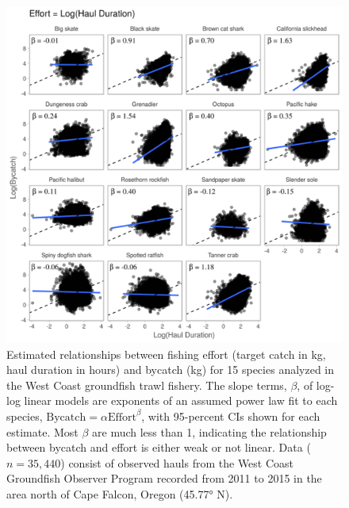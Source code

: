 \documentclass[]{article}
\begin{document}
\begin{figure}

{\centering \includegraphics[width=6in]{../figures/fig2_effort_bycatch/fig2_effort_bycatch_hauldur} 

}

\caption{Estimated relationships between fishing effort (target catch in kg, haul duration in hours) and bycatch (kg) for 15 species analyzed in the West Coast groundfish trawl fishery. The slope terms, $\beta$, of log-log linear models are exponents of an assumed power law fit to each species, $\text{Bycatch} = \alpha \text{Effort}^{\beta}$, with 95-percent CIs shown for each estimate. Most $\beta$ are much less than 1, indicating the relationship between bycatch and effort is either weak or not linear. Data ($n = 35,440$) consist of observed hauls from the West Coast Groundfish Observer Program recorded from 2011 to 2015 in the area north of Cape Falcon, Oregon (45.77° N).}\label{fig:effort-bycatch-2}
\end{figure}

\pagebreak
\end{document}

